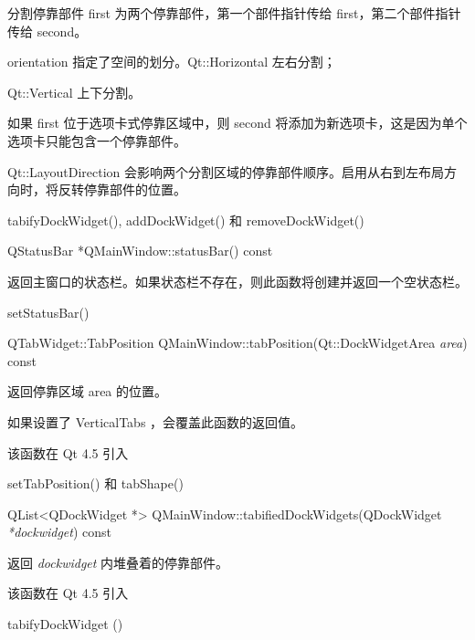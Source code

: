 分割停靠部件 first 为两个停靠部件，第一个部件指针传给 first，第二个部件指针传给 second。

orientation 指定了空间的划分。Qt::Horizontal 左右分割；

Qt::Vertical 上下分割。

\begin{notice}
如果 first 位于选项卡式停靠区域中，则 second 将添加为新选项卡，这是因为单个选项卡只能包含一个停靠部件。
    \end{notice}

\begin{notice}
Qt::LayoutDirection 会影响两个分割区域的停靠部件顺序。启用从右到左布局方向时，将反转停靠部件的位置。
\end{notice}


\begin{notice}[另请参阅]
tabifyDockWidget(), addDockWidget() 和 removeDockWidget()
\end{notice}

\splitLine

QStatusBar *QMainWindow::statusBar() const

返回主窗口的状态栏。如果状态栏不存在，则此函数将创建并返回一个空状态栏。

\begin{notice}[另请参阅]
setStatusBar()
\end{notice}

\splitLine

QTabWidget::TabPosition QMainWindow::tabPosition(Qt::DockWidgetArea \emph{area}) const

返回停靠区域 area 的位置。

\begin{notice}
如果设置了 VerticalTabs ，会覆盖此函数的返回值。
\end{notice}

该函数在 Qt 4.5 引入

\begin{notice}[另请参阅]
setTabPosition() 和 tabShape()
\end{notice}

\splitLine

QList<QDockWidget *> QMainWindow::tabifiedDockWidgets(QDockWidget \emph{*dockwidget}) const

返回 \emph{dockwidget} 内堆叠着的停靠部件。

该函数在 Qt 4.5 引入

\begin{notice}[另请参阅]
tabifyDockWidget ()
\end{notice}

